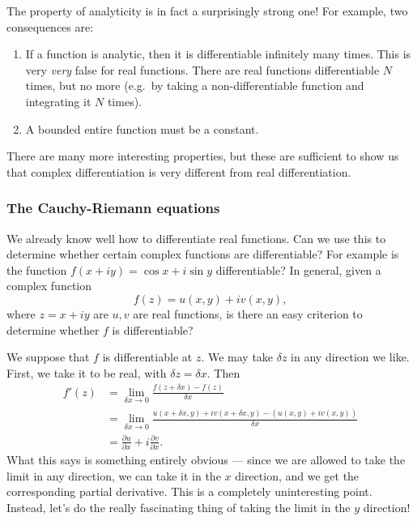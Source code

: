 \documentclass[a4paper]{article}
\begin{document}
The property of analyticity is in fact a surprisingly strong one! For example, two consequences are:
\begin{enumerate}
  \item If a function is analytic, then it is differentiable infinitely many times. This is very \emph{very} false for real functions. There are real functions differentiable $N$ times, but no more (e.g.\ by taking a non-differentiable function and integrating it $N$ times).
  \item A bounded entire function must be a constant.
\end{enumerate}
There are many more interesting properties, but these are sufficient to show us that complex differentiation is very different from real differentiation.
\subsubsection*{The Cauchy-Riemann equations}
We already know well how to differentiate real functions. Can we use this to determine whether certain complex functions are differentiable? For example is the function $f(x + iy) = \cos x + i\sin y$ differentiable? In general, given a complex function
\[
  f(z) = u(x, y) + iv(x, y),
\]
where $z = x + iy$ are $u, v$ are real functions, is there an easy criterion to determine whether $f$ is differentiable?

We suppose that $f$ is differentiable at $z$. We may take $\delta z$ in any direction we like. First, we take it to be real, with $\delta z = \delta x$. Then
\begin{align*}
  f'(z) &= \lim_{\delta x \to 0} \frac{f(z + \delta x) - f(z)}{\delta x}\\
  &= \lim_{\delta x \to 0} \frac{u(x + \delta x, y) + iv(x + \delta x, y) - (u(x, y) + iv(x, y))}{\delta x}\\
  &= \frac{\partial u}{\partial x} + i \frac{\partial v}{\partial x}.
\end{align*}
What this says is something entirely obvious --- since we are allowed to take the limit in any direction, we can take it in the $x$ direction, and we get the corresponding partial derivative. This is a completely uninteresting point. Instead, let's do the really fascinating thing of taking the limit in the $y$ direction!
\end{document}
